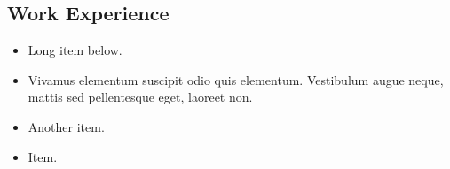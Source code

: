 \subsection{Work Experience}
	

\begin{itemize}
    \item Long item below.
    \item Vivamus elementum suscipit odio quis elementum. Vestibulum augue neque, mattis sed pellentesque eget, laoreet non.
    \item Another item.
\end{itemize}


\begin{itemize}
    \item Item.
\end{itemize}
